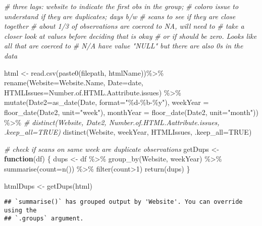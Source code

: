 \documentclass[
]{article}
\newenvironment{Shaded}{\begin{snugshade}}{\end{snugshade}}
\newcommand{\AttributeTok}[1]{\textcolor[rgb]{0.77,0.63,0.00}{#1}}
\newcommand{\CommentTok}[1]{\textcolor[rgb]{0.56,0.35,0.01}{\textit{#1}}}
\newcommand{\ConstantTok}[1]{\textcolor[rgb]{0.00,0.00,0.00}{#1}}
\newcommand{\ControlFlowTok}[1]{\textcolor[rgb]{0.13,0.29,0.53}{\textbf{#1}}}
\newcommand{\DecValTok}[1]{\textcolor[rgb]{0.00,0.00,0.81}{#1}}
\newcommand{\FunctionTok}[1]{\textcolor[rgb]{0.00,0.00,0.00}{#1}}
\newcommand{\NormalTok}[1]{#1}
\newcommand{\OtherTok}[1]{\textcolor[rgb]{0.56,0.35,0.01}{#1}}
\newcommand{\SpecialCharTok}[1]{\textcolor[rgb]{0.00,0.00,0.00}{#1}}
\newcommand{\StringTok}[1]{\textcolor[rgb]{0.31,0.60,0.02}{#1}}
\begin{document}
\begin{Shaded}
\begin{Highlighting}[]
\CommentTok{\# three lags: website to indicate the first obs in the group; }
\CommentTok{\# coloro issue to understand if they are duplicates; days b/w }
\CommentTok{\# scans to see if they are close together}
\CommentTok{\# about 1/3 of observations are coerced to NA, will need to }
\CommentTok{\# take a closer look at values before deciding that is okay}
\CommentTok{\# or if should be zero. Looks like all that are coerced to }
\CommentTok{\# N/A have value "NULL" but there are also 0s in the data}

\NormalTok{html }\OtherTok{\textless{}{-}} \FunctionTok{read.csv}\NormalTok{(}\FunctionTok{paste0}\NormalTok{(filepath, htmlName))}\SpecialCharTok{\%\textgreater{}\%}
  \FunctionTok{rename}\NormalTok{(}\AttributeTok{Website=}\NormalTok{Website.Name, }\AttributeTok{Date=}\NormalTok{date, }\AttributeTok{HTMLIssues=}\NormalTok{Number.of.HTML.Aattribute.issues) }\SpecialCharTok{\%\textgreater{}\%}
  \FunctionTok{mutate}\NormalTok{(}\AttributeTok{Date2=}\FunctionTok{as\_date}\NormalTok{(Date, }\AttributeTok{format=}\StringTok{"\%d{-}\%b{-}\%y"}\NormalTok{),}
    \AttributeTok{weekYear =} \FunctionTok{floor\_date}\NormalTok{(Date2, }\AttributeTok{unit=}\StringTok{"week"}\NormalTok{),}
    \AttributeTok{monthYear =} \FunctionTok{floor\_date}\NormalTok{(Date2, }\AttributeTok{unit=}\StringTok{"month"}\NormalTok{)) }\SpecialCharTok{\%\textgreater{}\%}
  \CommentTok{\# distinct(Website, Date2, Number.of.HTML.Aattribute.issues, .keep\_all=TRUE)}
  \FunctionTok{distinct}\NormalTok{(Website, weekYear, HTMLIssues, }\AttributeTok{.keep\_all=}\ConstantTok{TRUE}\NormalTok{)}

\CommentTok{\# check if scans on same week are duplicate observations }
\NormalTok{getDups }\OtherTok{\textless{}{-}} \ControlFlowTok{function}\NormalTok{(df) \{}
\NormalTok{  dups }\OtherTok{\textless{}{-}}\NormalTok{ df }\SpecialCharTok{\%\textgreater{}\%} 
    \FunctionTok{group\_by}\NormalTok{(Website, weekYear) }\SpecialCharTok{\%\textgreater{}\%}
    \FunctionTok{summarise}\NormalTok{(}\AttributeTok{count=}\FunctionTok{n}\NormalTok{()) }\SpecialCharTok{\%\textgreater{}\%}
    \FunctionTok{filter}\NormalTok{(count}\SpecialCharTok{\textgreater{}}\DecValTok{1}\NormalTok{) }
  \FunctionTok{return}\NormalTok{(dups)}
\NormalTok{\}}

\NormalTok{htmlDups }\OtherTok{\textless{}{-}} \FunctionTok{getDups}\NormalTok{(html)}
\end{Highlighting}
\end{Shaded}

\begin{verbatim}
## `summarise()` has grouped output by 'Website'. You can override using the
## `.groups` argument.
\end{verbatim}
\end{document}
